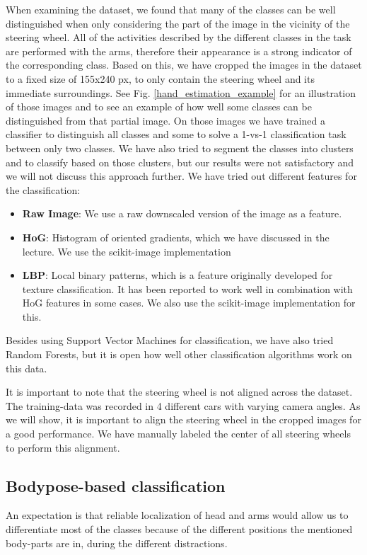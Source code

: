 \documentclass[10pt,twocolumn,letterpaper]{article}
\begin{document}
When examining the dataset, we found that many of the classes can be well distinguished when only considering the part of the image in the vicinity of the steering wheel. All of the activities described by the different classes in the task are performed with the arms, therefore their appearance is a strong indicator of the corresponding class. Based on this, we have cropped the images in the dataset to a fixed size of 155x240 px, to only contain the steering wheel and its immediate surroundings. See Fig. \ref{hand_estimation_example} for an illustration of those images and to see an example of how well some classes can be distinguished from that partial image. On those images we have trained a classifier to distinguish all classes and some to solve a 1-vs-1 classification task between only two classes. We have also tried to segment the classes into clusters and to classify based on those clusters, but our results were not satisfactory and we will not discuss this approach further. We have tried out different features for the classification:
\begin{itemize}
	\item \textbf{Raw Image}: We use a raw downscaled version of the image as a feature.
	\item \textbf{HoG}: Histogram of oriented gradients, which we have discussed in the lecture. We use the scikit-image implementation
	\item \textbf{LBP}: Local binary patterns, which is a feature originally developed for texture classification. It has been reported to work well in combination with HoG features in some cases. We also use the scikit-image implementation for this.
\end{itemize}
Besides using Support Vector Machines for classification,  we have also tried Random Forests, but it is open how well other classification algorithms work on this data.

It is important to note that the steering wheel is not aligned across the dataset. The training-data was recorded in 4 different cars with varying camera angles. As we will show, it is important to align the steering wheel in the cropped images for a good performance. We have manually labeled the center of all steering wheels to perform this alignment.



\subsection{Bodypose-based classification}
An expectation is that reliable localization of head and arms would allow us to differentiate most of the classes because of the different positions the mentioned body-parts are in, during the different distractions.
\end{document}
